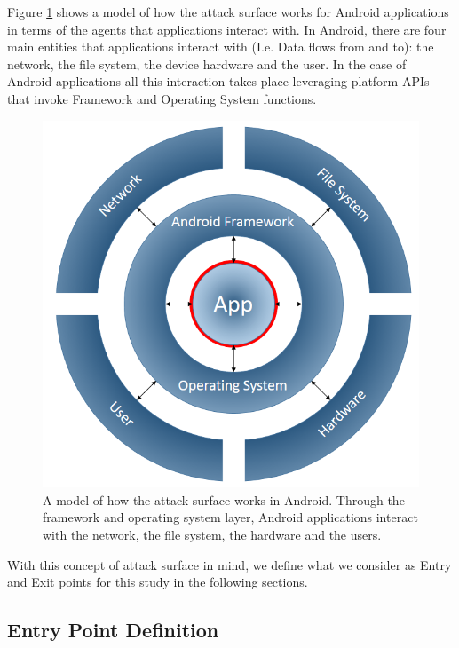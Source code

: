 \documentclass{sig-alternate}
\begin{document}
Figure \ref{fig:androidattacksurfacemodel} shows a model of how the attack surface works for Android applications in terms of the agents that applications interact with. In Android, there are four main entities that applications interact with (I.e. Data flows from and to): the network, the file system, the device hardware and the user. In the case of Android applications all this interaction takes place leveraging platform APIs that invoke Framework and Operating System functions.

\begin{figure}
  \centering
  \includegraphics[scale=0.30]{figs/androidattacksurfacemodel.png}
  \caption{A model of how the attack surface works in Android. Through the framework and operating system layer, Android applications interact with the network, the file system, the hardware and the users.}
  \label{fig:androidattacksurfacemodel}
\end{figure}

With this concept of attack surface in mind, we define what we consider as Entry and Exit points for this study in the following sections.

\subsection{Entry Point Definition}
\end{document}
